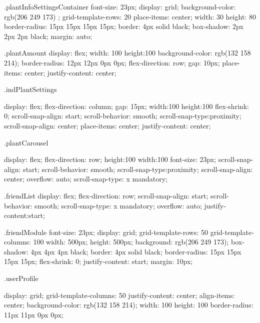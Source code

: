 \documentclass[12pt]{article} %
\begin{document}
\begin{htmlcode}[caption={CSS Stlye Sheet}]
    .plantInfoSettingsContainer
    {
       font-size: 23px;
       display: grid;
       background-color: rgb(206 249 173) ;
       grid-template-rows: 20%
       place-items: center;
       width: 30%
       height: 80%
       border-radius: 15px 15px 15px 15px;
       border: 4px solid black;
       box-shadow:  2px 2px 2px black;
       margin: auto;
    }
    
    .plantAmount
    {
       display: flex;
       width: 100%
       height:100%
       background-color: rgb(132 158 214);
       border-radius: 12px 12px 0px 0px;
       flex-direction: row;
       gap: 10px;
       place-items: center;
       justify-content: center;
    }
    
    .indPlantSettings
    {
       display: flex;
       flex-direction: column;
       gap: 15px;
       width:100%
       height:100%
       flex-shrink: 0;
       scroll-snap-align: start;
       scroll-behavior: smooth;
       scroll-snap-type:proximity;
       scroll-snap-align: center;
       place-items: center;
       justify-content: center;
    
    }
    
    .plantCarousel
    {
       display: flex;
       flex-direction: row;
       height:100%
       width:100%
       font-size: 23px;
       scroll-snap-align: start;
       scroll-behavior: smooth;
       scroll-snap-type:proximity;
       scroll-snap-align: center;
       overflow: auto;
       scroll-snap-type: x mandatory;
       
    }
    .friendList {
       display: flex;
       flex-direction: row;
       scroll-snap-align: start;
       scroll-behavior: smooth;
       scroll-snap-type: x mandatory;
       overflow: auto;
       justify-content:start;
    }
    
    .friendModule
    {
       font-size: 23px;
       display: grid;
       grid-template-rows: 50%
       grid-template-columns: 100%
       width: 500px;
       height: 500px;
       background: rgb(206 249 173);
       box-shadow: 4px 4px 4px black;
       border: 4px solid black;
       border-radius: 15px 15px 15px 15px;
       flex-shrink: 0;
       justify-content: start;
       margin: 10px;
    }
    
    .userProfile
    {
       display: grid;
       grid-template-columns: 50%
       justify-content: center;
       align-items: center;
       background-color: rgb(132 158 214);
       width: 100%
       height: 100%
       border-radius: 11px 11px 0px 0px;
    
}
\end{htmlcode}
\end{document}
